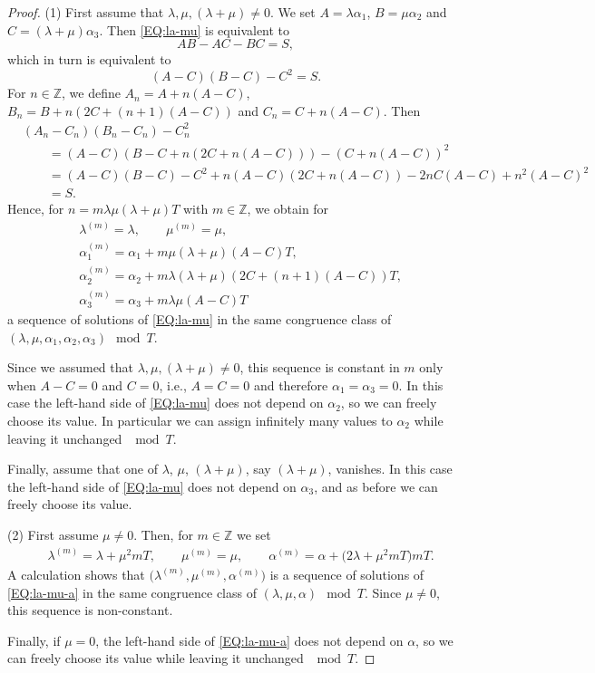 \documentclass[10pt,a4paper]{amsart}
\numberwithin{equation}{section}
\theoremstyle{definition}
\numberwithin{table}{section}
\newcommand{\Z}{\mathbb{Z}}
\begin{document}
\begin{proof}
		(1) First assume that $\lambda,\mu,(\lambda+\mu)\neq 0$. We set $A=\lambda\alpha_1$, $B=\mu\alpha_2$ and $C=(\lambda+\mu)\alpha_3$. Then \eqref{EQ:la-mu} is equivalent to
		\[ AB-AC-BC=S, \]
		which in turn is equivalent to
		\[ (A-C)(B-C)-C^2=S. \]
		For $n\in\Z$, we define $A_n=A+n(A-C)$, $B_n=B+n(2C+(n+1)(A-C))$ and $C_n=C+n(A-C)$. Then
		\begin{align*}
			 &(A_n-C_n)(B_n-C_n)-C_n^2\\
&\qquad =(A-C)(B-C+n(2C+n(A-C))) - (C+n(A-C))^2\\
&\qquad			= (A-C)(B-C)-C^2+n(A-C)(2C+n(A-C)) - 2nC(A-C)+n^2(A-C)^2\\		
&\qquad				= S.
		\end{align*}
		Hence, for $n=m\lambda\mu(\lambda+\mu)T$ with $m\in\Z$, we obtain for
		\begin{align*}
			&\lambda^{(m)}=\lambda,\qquad \mu^{(m)}=\mu,\\
			&\alpha_1^{(m)}=\alpha_1+m\mu(\lambda+\mu)(A-C)T,\\
			&\alpha_2^{(m)}=\alpha_2+m\lambda(\lambda+\mu)(2C+(n+1)(A-C))T,\\
			&\alpha_3^{(m)}=\alpha_3+m\lambda\mu(A-C)T
		\end{align*}
		a sequence of solutions of \eqref{EQ:la-mu} in the same congruence class of $(\lambda,\mu,\alpha_1,\alpha_2,\alpha_3)\mod T$.
		
		Since we assumed that $\lambda,\mu,(\lambda+\mu)\neq 0$, this sequence is constant in $m$ only when $A-C=0$ and $C=0$, i.e., $A=C=0$ and therefore $\alpha_1=\alpha_3=0$. In this case the left-hand side of \eqref{EQ:la-mu} does not depend on $\alpha_2$, so we can freely choose its value. In particular we can assign infinitely many values to $\alpha_2$ while leaving it unchanged $\mod T$.
		
		Finally, assume that one of $\lambda$, $\mu$, $(\lambda+\mu)$, say $(\lambda+\mu)$, vanishes. In this case the left-hand side of \eqref{EQ:la-mu} does not depend on $\alpha_3$, and as before we can freely choose its value.
		
        (2) First assume $\mu\neq0$. Then, for $m\in\Z$ we set
		\begin{align*}
			&\lambda^{(m)}=\lambda+\mu^2m T,\qquad
            \mu^{(m)}=\mu,\qquad
			\alpha^{(m)}=\alpha+\bigl(2\lambda+\mu^2mT\bigr)mT.
		\end{align*}
		A calculation shows that $\bigl(\lambda^{(m)},\mu^{(m)},\alpha^{(m)}\bigr)$ is a sequence of solutions of \eqref{EQ:la-mu-a} in the same congruence class of $(\lambda,\mu,\alpha)\mod T$. Since $\mu\neq 0$, this sequence is non-constant.
		
		Finally, if $\mu=0$, the left-hand side of \eqref{EQ:la-mu-a} does not depend on $\alpha$, so we can freely choose its value while leaving it unchanged $\mod T$.
\end{proof}
\end{document}
